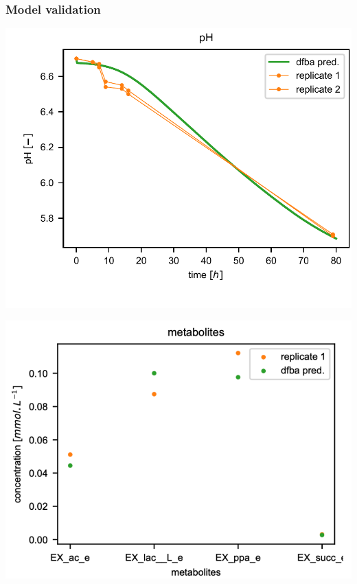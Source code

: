 \documentclass[8pt,usenames,dvipsnames]{beamer}
\begin{document}
\begin{frame}
%
%
%
%
\end{frame}


\begin{frame}
\frametitle{Model validation}
\begin{minipage}{0.5\textwidth}
\includegraphics[width=\textwidth]{figures/validation-lp.pdf}
\end{minipage}%
\begin{minipage}{0.5\textwidth}
\vspace{-0.5cm}
\includegraphics[width=\textwidth]{figures/validation-pf.pdf}

\end{minipage}
\end{frame}
\end{document}
